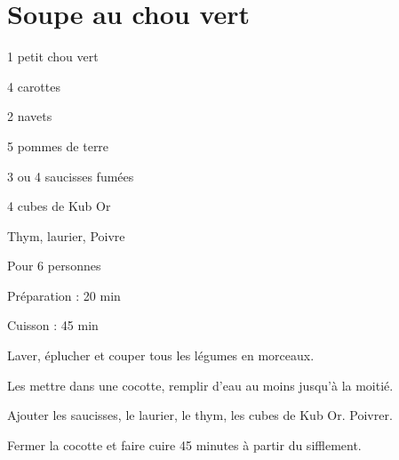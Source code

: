 \section[\normalsize{Soupe au chou vert}]{Soupe au chou vert}


\begin{ingredients}
\item 1 petit chou vert
\item 4 carottes
\item 2 navets
\item 5 pommes de terre
\item 3 ou 4 saucisses fum\'ees
\item 4 cubes de Kub Or
\item Thym, laurier, Poivre
\end{ingredients}
\begin{infos}
\item Pour 6 personnes
\item Préparation : 20 min
\item Cuisson : 45 min
\end{infos}

\begin{etapes}
\item Laver, \'eplucher et couper tous les l\'egumes en morceaux.
\item Les mettre dans une cocotte, remplir d'eau au moins 
jusqu'\`a la moiti\'e. 
\item Ajouter les saucisses, le laurier, le thym, les cubes de 
Kub Or. Poivrer.
\item Fermer la cocotte et faire cuire 45 minutes \`a partir du 
sifflement.
\end{etapes}
\begin{conseils}
\end{conseils}
